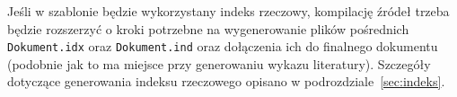 Jeśli w szablonie będzie wykorzystany indeks rzeczowy, kompilację źródeł trzeba będzie rozszerzyć o kroki potrzebne na wygenerowanie plików pośrednich \texttt{Dokument.idx} oraz \texttt{Dokument.ind} oraz dołączenia ich do finalnego dokumentu (podobnie jak to ma miejsce przy generowaniu wykazu literatury).
Szczegóły dotyczące generowania indeksu rzeczowego opisano w podrozdziale~\ref{sec:indeks}.